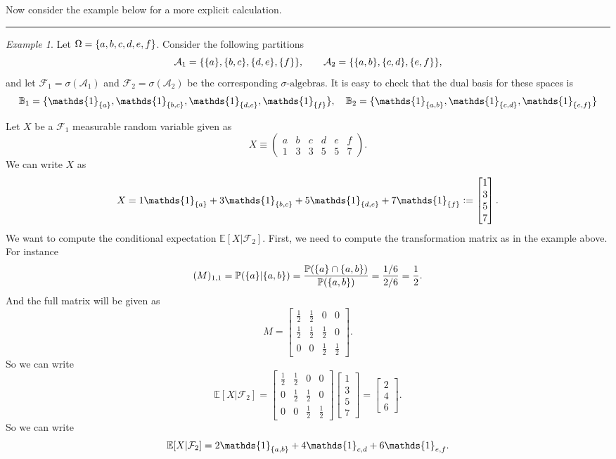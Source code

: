 \documentclass[11pt,a4paper]{article}
\theoremstyle{definition}
\theoremstyle{remark}
\newtheorem{example}{Example}
\newcommand{\E}{\mathbb{E}}
\begin{document}
	
	Now consider the example below for a more explicit calculation.
	
	\vspace{5pt}
	\hrule 
	\begin{example}
		Let $ \Omega = \{a,b,c,d,e,f\} $. Consider the following partitions
		\[ \mathcal{A}_1 = \{\{a\},\{b,c\},\{d,e\},\{f\}\}, \qquad \mathcal{A}_2= \{\{a,b\},\{c,d\},\{e,f\}\}, \]
		and let $ \mathcal{F}_1 = \sigma(\mathcal{A}_1) $ and $ \mathcal{F}_2=\sigma(\mathcal{A}_2) $ be the corresponding $\sigma\text{-algebra}$s. It is easy to check that the dual basis for these spaces is
		\[ \mathbb{B}_1 = \set{\mathds{1}_{\set{a}},\mathds{1}_{\set{b,c}},\mathds{1}_{\set{d,e}},\mathds{1}_{\set{f}}}, \quad \mathbb{B}_2 = \set{\mathds{1}_{\set{a,b}},\mathds{1}_{\set{c,d}},\mathds{1}_{\set{e,f}}} \]
		
		
		
		Let $ X $ be a $ \mathcal{F}_1 $ measurable random variable given as
		\[ X \equiv \begin{pmatrix}
			a & b & c & d & e & f \\
			1 & 3 & 3 & 5 & 5 & 7
		\end{pmatrix}. \]
		We can write $ X $ as
		\[ X = 1\mathds{1}_{\set{a}} + 3 \mathds{1}_{\set{b,c}} + 5 \mathds{1}_{\set{d,e}} + 7 \mathds{1}_{\set{f}} := \begin{bmatrix}
			1 \\ 3 \\ 5 \\ 7
		\end{bmatrix}. \]
		We want to compute the conditional expectation $ \E[X|\mathcal{F}_2] $. First, we need to compute the transformation matrix as in the example above. For instance 
		\[ (M)_{1,1} = \mathbb{P}(\{a\}|\{a,b\}) = \frac{\mathbb{P}(\{a\}\cap \{a,b\})}{\mathbb{P}(\{a,b\})} = \frac{1/6}{2/6} = \frac{1}{2}. \]
		And the full matrix will be given as
		\[ M = \begin{bmatrix}
			\frac{1}{2} & \frac{1}{2} & 0 & 0 \\
			\frac{1}{2} & \frac{1}{2} & \frac{1}{2} & 0 \\
			0 & 0 & \frac{1}{2} & \frac{1}{2} 
		\end{bmatrix}. \]
		So we can write
		\[ \E[X|\mathcal{F}_2] = \begin{bmatrix}
			\frac{1}{2} & \frac{1}{2} & 0 & 0 \\
			0 & \frac{1}{2} & \frac{1}{2} & 0 \\
			0 & 0 & \frac{1}{2} & \frac{1}{2} 
		\end{bmatrix}
		\begin{bmatrix}
			1 \\ 3 \\ 5 \\ 7
		\end{bmatrix}
		=
		\begin{bmatrix}
			2 \\ 4 \\ 6
		\end{bmatrix}.  \]
		So we can write
		\[ \E[X|\mathcal{F}_2] = 2\mathds{1}_{\set{a,b}} + 4\mathds{1}_{c,d} + 6 \mathds{1}_{e,f}. \]
		

\end{example}
\end{document}
